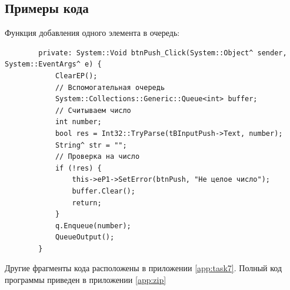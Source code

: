 \subsection{Примеры кода}

Функция добавления одного элемента в очередь:

\begin{verbatim}
		private: System::Void btnPush_Click(System::Object^ sender, System::EventArgs^ e) {
			ClearEP();
			// Вспомогательная очередь
			System::Collections::Generic::Queue<int> buffer;
			// Считываем число
			int number;
			bool res = Int32::TryParse(tBInputPush->Text, number);
			String^ str = "";
			// Проверка на число
			if (!res) {
				this->eP1->SetError(btnPush, "Не целое число");
				buffer.Clear();
				return;
			}
			q.Enqueue(number);
			QueueOutput();
		}
\end{verbatim}

Другие фрагменты кода расположены в приложении \ref{app:task7}. Полный код программы приведен в приложении \ref{app:zip}
